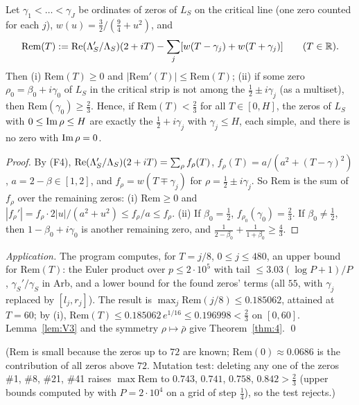 \begin{lemma}\label{lem:V3}
Let $\gamma_1<\dots<\gamma_J$ be ordinates of zeros of $L_S$ on the critical line (one zero counted for each $j$), $w(u)=\frac32/(\frac94+u^2)$, and
\[
\mathrm{Rem}(T):=\operatorname{Re}(\Lambda_S'/\Lambda_S)(2+iT)-\sum_{j}[w(T-\gamma_j)+w(T+\gamma_j)]\qquad(T\in\mathbb R).
\]
Then \textup{(i)} $\mathrm{Rem}(T)\ge0$ and $|\mathrm{Rem}'(T)|\le\mathrm{Rem}(T)$; \textup{(ii)} if some zero $\rho_0=\beta_0+i\gamma_0$ of $L_S$ in the critical strip is not among the $\frac12\pm i\gamma_j$ (as a multiset), then $\mathrm{Rem}(\gamma_0)\ge\frac23$. Hence, if $\mathrm{Rem}(T)<\frac23$ for all $T\in[0,H]$, the zeros of $L_S$ with $0\le\operatorname{Im}\rho\le H$ are exactly the $\frac12+i\gamma_j$ with $\gamma_j\le H$, each simple, and there is no zero with $\operatorname{Im}\rho=0$.
\end{lemma}

\begin{proof}
By (F4), $\operatorname{Re}(\Lambda_S'/\Lambda_S)(2+iT)=\sum_\rho f_\rho(T)$, $f_\rho(T)=a/(a^2+(T-\gamma)^2)$, $a=2-\beta\in[1,2]$, and $f_\rho=w(T\mp\gamma_j)$ for $\rho=\frac12\pm i\gamma_j$. So $\mathrm{Rem}$ is the sum of $f_\rho$ over the remaining zeros: (i) $\mathrm{Rem}\ge0$ and $|f_\rho'|=f_\rho\cdot2|u|/(a^2+u^2)\le f_\rho/a\le f_\rho$. (ii) If $\beta_0=\frac12$, $f_{\rho_0}(\gamma_0)=\frac23$. If $\beta_0\ne\frac12$, then $1-\beta_0+i\gamma_0$ is another remaining zero, and $\frac1{2-\beta_0}+\frac1{1+\beta_0}\ge\frac43$.
\end{proof}

\emph{Application.} The program computes, for $T=j/8$, $0\le j\le480$, an upper bound for $\mathrm{Rem}(T)$: the Euler product over $p\le2\cdot10^5$ with tail $\le3.03(\log P+1)/P$, $\gamma_S'/\gamma_S$ in Arb, and a lower bound for the found zeros' terms (all $55$, with $\gamma_j$ replaced by $[l_j,r_j]$). The result is $\max_j\mathrm{Rem}(j/8)\le0.185062$, attained at $T=60$; by (i), $\mathrm{Rem}(T)\le0.185062\,e^{1/16}\le0.196998<\frac23$ on $[0,60]$. Lemma~\ref{lem:V3} and the symmetry $\rho\mapsto\bar\rho$ give Theorem~\ref{thm:4}. \qed

($\mathrm{Rem}$ is small because the zeros up to $72$ are known; $\mathrm{Rem}(0)\approx0.0686$ is the contribution of all zeros above $72$. Mutation test: deleting any one of the zeros \#1, \#8, \#21, \#41 raises $\max\mathrm{Rem}$ to $0.743$, $0.741$, $0.758$, $0.842>\frac23$ (upper bounds computed by  with $P=2\cdot10^4$ on a grid of step $\frac14$), so the test rejects.)

